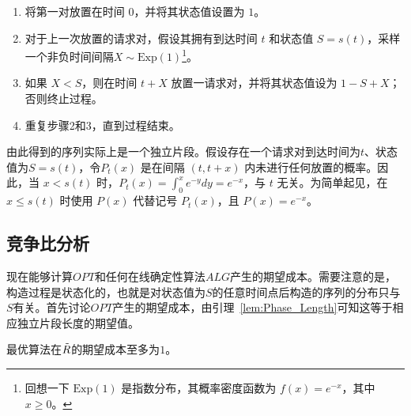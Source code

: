 \renewcommand{\labelenumi}{(\arabic{enumi})}
\begin{enumerate}[align=left, labelsep=-0.5em, itemindent=3.2em, leftmargin=0em]
\item 将第一对放置在时间 $0$，并将其状态值设置为 $1$。
\item 对于上一次放置的请求对，假设其拥有到达时间 $t$ 和状态值 $S=s(t)$，采样一个非负时间间隔$X\sim \mathrm{Exp}(1)$\footnote{回想一下 $\mathrm{Exp}(1)$ 是指数分布，其概率密度函数为 $f(x)=e^{-x}$，其中 $x \geq 0$。}。
\item 如果 $X<S$，则在时间 $t+X$ 放置一请求对，并将其状态值设为 $1-S+X$；否则终止过程。
\item 重复步骤2和3，直到过程结束。
\end{enumerate}


由此得到的序列实际上是一个独立片段。假设存在一个请求对到达时间为$t$、状态值为$S=s(t)$，令$P_t(x)$ 是在间隔 $(t,t+x)$ 内未进行任何放置的概率。因此，当 $x<s(t)$ 时，$P_t(x)=\int_{0}^{x}e^{-y}dy=e^{-x}$，与 $t$ 无关。为简单起见，在 $x\leq s(t)$ 时使用 $P(x)$ 代替记号 $P_t(x)$，且 $P(x)=e^{-x}$。

\subsection{竞争比分析}




现在能够计算$OPT$和任何在线确定性算法$ALG$产生的期望成本。需要注意的是，构造过程是状态化的，也就是对状态值为$S$的任意时间点后构造的序列的分布只与$S$有关。首先讨论$OPT$产生的期望成本，由引理~\ref{lem:Phase_Length}可知这等于相应独立片段长度的期望值。

\begin{lemma}\label{lemma:optcost}
    最优算法在$\tilde{R}$的期望成本至多为$1$。
\end{lemma}
    
